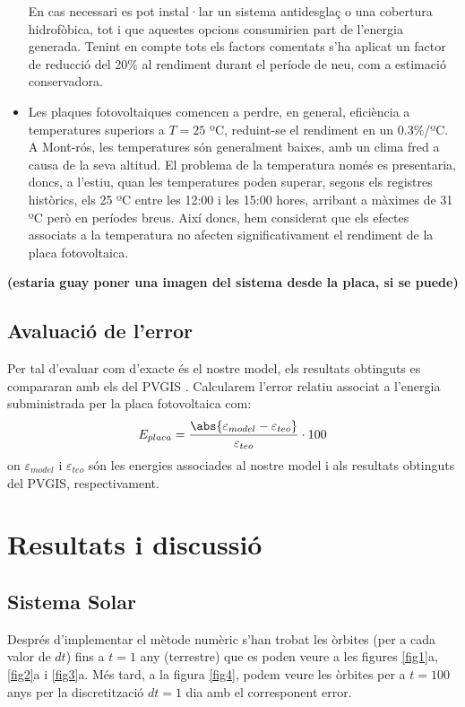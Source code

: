 \documentclass[10pt, twoside, a4paper]{article}
\begin{document}
\begin{itemize}
    En cas necessari es pot instal·lar un sistema antidesglaç o una cobertura hidrofòbica, tot i que aquestes opcions consumirien part de l'energia generada. 
    Tenint en compte tots els factors comentats s'ha aplicat un factor de reducció del 20\% al rendiment durant el període de neu, com a estimació conservadora.
    \item Les plaques fotovoltaiques comencen a perdre, en general, eficiència a temperatures superiors a $T=25$ ºC, reduint-se el rendiment en un 0.3\%/ºC. A Mont-rós, les temperatures són generalment baixes, amb un clima fred a causa de la seva altitud. El problema de la temperatura només es presentaria, doncs, a l'estiu, quan les temperatures poden superar, segons els registres històrics, els 25 ºC entre les 12:00 i les 15:00 hores, arribant a màximes de 31 ºC però en períodes breus. 
    Així doncs, hem considerat que els efectes associats a la temperatura no afecten significativament el rendiment de la placa fotovoltaica.

\end{itemize}

\textbf{(estaria guay poner una imagen del sistema desde la placa, si se puede)}

\subsection{Avaluació de l'error}
Per tal d'evaluar com d'exacte és el nostre model, els resultats obtinguts es compararan amb els del PVGIS \cite{ref7}. Calcularem l'error relatiu associat a l'energia subministrada per la placa fotovoltaica com:
\begin{equation}
    E_{placa} = \frac{\abs{\varepsilon_{model}-\varepsilon_{teo}}}{\varepsilon_{teo}}\cdot 100
\end{equation}
on $\varepsilon_{model}$ i $\varepsilon_{teo}$ són les energies associades al nostre model i als resultats obtinguts del PVGIS, respectivament.

\section{Resultats i discussió}

\subsection{Sistema Solar}
Després d'implementar el mètode numèric s'han trobat les òrbites (per a cada valor de $dt$) fins a $t=1$ any (terrestre) que es poden veure a les figures \ref{fig1}a, \ref{fig2}a i \ref{fig3}a. Més tard, a la figura \ref{fig4}, podem veure les òrbites per a $t=100$ anys per la discretització $dt=1$ dia amb el corresponent error.
 
\end{document}

